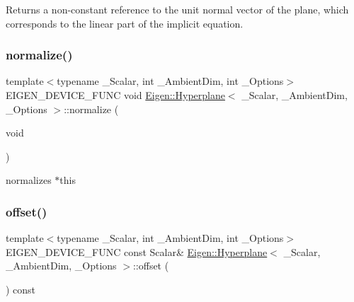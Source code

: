 \begin{DoxyReturn}{Returns}
a non-\/constant reference to the unit normal vector of the plane, which corresponds to the linear part of the implicit equation. 
\end{DoxyReturn}
\mbox{\label{class_eigen_1_1_hyperplane_ac12d2a82db8f058f01b2de92d55a65e6}} 
\subsubsection{\texorpdfstring{normalize()}{normalize()}}
{\footnotesize\ttfamily template$<$typename \+\_\+\+Scalar, int \+\_\+\+Ambient\+Dim, int \+\_\+\+Options$>$ \\
E\+I\+G\+E\+N\+\_\+\+D\+E\+V\+I\+C\+E\+\_\+\+F\+U\+NC void \mbox{\hyperlink{class_eigen_1_1_hyperplane}{Eigen\+::\+Hyperplane}}$<$ \+\_\+\+Scalar, \+\_\+\+Ambient\+Dim, \+\_\+\+Options $>$\+::normalize (\begin{DoxyParamCaption}\item[{void}]{ }\end{DoxyParamCaption})\hspace{0.3cm}{\ttfamily [inline]}}

normalizes {\ttfamily $\ast$this} \mbox{\label{class_eigen_1_1_hyperplane_afe2eadf3679e4a802c0e02c15049aed9}} 
\subsubsection{\texorpdfstring{offset()}{offset()}\hspace{0.1cm}{\footnotesize\ttfamily [1/2]}}
{\footnotesize\ttfamily template$<$typename \+\_\+\+Scalar, int \+\_\+\+Ambient\+Dim, int \+\_\+\+Options$>$ \\
E\+I\+G\+E\+N\+\_\+\+D\+E\+V\+I\+C\+E\+\_\+\+F\+U\+NC const Scalar\& \mbox{\hyperlink{class_eigen_1_1_hyperplane}{Eigen\+::\+Hyperplane}}$<$ \+\_\+\+Scalar, \+\_\+\+Ambient\+Dim, \+\_\+\+Options $>$\+::offset (\begin{DoxyParamCaption}{ }\end{DoxyParamCaption}) const\hspace{0.3cm}{\ttfamily [inline]}}

